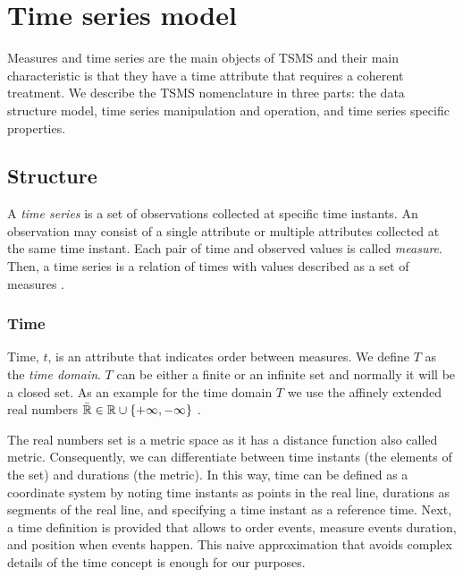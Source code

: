 

\section{Time series model}
\label{sec:model:TSMS}



Measures and time series are the main objects of TSMS and their main
characteristic is that they have a time attribute that requires a
coherent treatment. We describe the TSMS nomenclature in three parts:
 the data structure model,  time series manipulation and
operation, and  time series specific properties.



\subsection{Structure}


A \emph{time series} is a set of observations collected at specific
time instants. An observation may consist of a single attribute or
multiple attributes collected at the same time instant.  Each pair of
time and observed values is called \emph{measure}. Then, a time series
is a relation of times with values described as a set of measures .





\subsubsection{Time}

Time, $t$, is an attribute that indicates order between measures. We define
$T$ as the \emph{time domain}. $T$ can be either a finite or an infinite set
and normally it will be a closed set. As an example for the time
domain $T$ we use the affinely extended real numbers $\bar{\mathbb{R}} \in \mathbb{R} \cup
\{+\infty,-\infty\}$ \cite{cantrell:extendedreal}.

The real numbers set is a metric space as it has a distance function
also called metric. Consequently, we can differentiate between time
instants (the elements of the set) and durations (the metric). In this
way, time can be defined as a coordinate system
\cite{iep:time-supplement,kopetz11:realtime} by noting time instants
as points in the real line, durations as segments of the real line,
and specifying a time instant as a reference time. Next, a time
definition is provided that allows to order events, measure events
duration, and position when events happen. This naive approximation
that avoids complex details of the time concept is enough for our
purposes.

